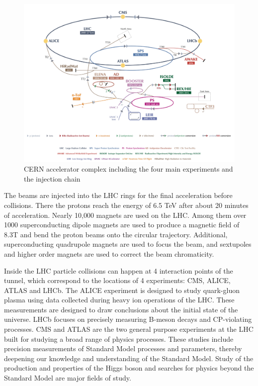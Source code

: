 \begin{figure}[htbp]
\begin{center}
\includegraphics[width=0.72\linewidth]{figures/lhc_lhc.pdf}
\caption{CERN accelerator complex including the four main experiments and the injection chain}
\label{fig:lhc_lhc}
\end{center}
\end{figure}

\vspace{0.3cm}
The beams are injected into the LHC rings for the final acceleration before collisions. There the protons reach the energy of 6.5 TeV after about 20 minutes of acceleration. Nearly 10,000 magnets are used on the LHC. Among them over 1000 superconducting dipole magnets are used to produce a magnetic field of 8.3T and bend the proton beams onto the circular trajectory. Additional, superconducting quadrupole magnets are used to focus the beam, and sextupoles and higher order magnets are used to correct the beam chromaticity.

\vspace{0.3cm}
Inside the LHC particle collisions can happen at 4 interaction points of the tunnel, which correspond to the locations of 4 experiments: CMS, ALICE, ATLAS and LHCb. The ALICE experiment is designed to study quark-gluon plasma using data collected during heavy ion operations of the LHC. These measurements are designed to draw conclusions about the initial state of the universe. LHCb focuses on precisely measuring B-meson decays and CP-violating processes. CMS and ATLAS are the two general purpose experiments at the LHC built for studying a broad range of physics processes. These studies include precision measurements of Standard Model processes and parameters, thereby deepening our knowledge and understanding of the Standard Model. Study of the production and properties of the Higgs boson and searches for physics beyond the Standard Model are major fields of study.

